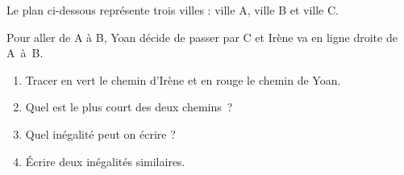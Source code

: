 \documentclass[activite]{thedocument}
\begin{document}
Le plan ci-dessous représente trois villes : ville {\sf A}, ville {\sf B} et ville {\sf C}.
    \begin{center}
    \end{center}
    Pour aller de {\sf A} à {\sf B}, Yoan décide de passer par {\sf C} et Irène
    va en ligne droite de {\sf A}~à~{\sf B}.
    \begin{enumerate}
        \item Tracer en vert le chemin d'Irène et en rouge le chemin de Yoan.
        \item Quel est le plus court des deux chemins~?
        \dotedline\dotedline
        \item Quel inégalité peut on écrire ?
        \dotedline
        \item Écrire deux inégalités similaires.
        \dotedline\dotedline
    \end{enumerate}
\end{document}
